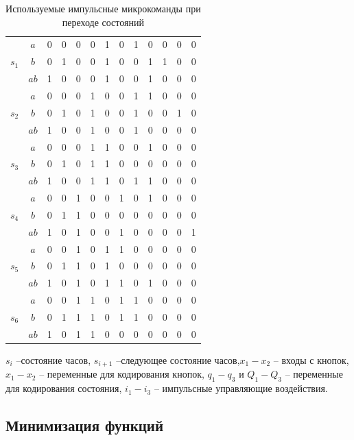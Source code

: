 \documentclass[10pt,a4paper,final]{article} %
\begin{document}
\begin{table}[h!]
\begin{tabular}{|c|c|cc|ccc|ccc|ccc|}
			\multirow{3}{*}{$s_1$} & $a$ & 0 &	0	 & 0	& 0	& 1	& 0	& 1	& 0	& 0	& 0	& 0 \\
			& $b$ & 0	& 1	& 0	& 0	& 1	& 0	& 0	& 1	& 1	& 0	& 0 \\ 
			& $ab$  & 1	& 0	& 0	& 0	& 1	& 0	& 0	& 1	& 0	& 0	& 0 \\
			\hline
			\multirow{3}{*}{$s_2$} & $a$  & 0	& 0	& 0	& 1	& 0	& 0	& 1	& 1	& 0	& 0	& 0 \\
			& $b$ & 0	& 1	& 0	& 1	& 0	& 0	& 1	& 0	& 0	& 1	& 0 \\
			& $ab$& 1	& 0	& 0	& 1	& 0	& 0	& 1	& 0	& 0	& 0	& 0 \\
			\hline
			\multirow{3}{*}{$s_3$} & $a$  & 0	& 0	& 0	& 1	& 1	& 0	& 0	& 1	& 0	& 0	& 0 \\
			& $b$ & 0	& 1	& 0	& 1	& 1	& 0	& 0	& 0	& 0	& 0	& 0 \\
			& $ab$ & 1	& 0	& 0	& 1	& 1	& 0	& 1	& 1	& 0	& 0	& 0 \\
			\hline
			\multirow{3}{*}{$s_4$} & $a$& 0	& 0	& 1	& 0	& 0	& 1	& 0	& 1	& 0	& 0	& 0 \\
			& $b$ & 0	& 1	& 1	& 0	& 0	& 0	& 0	& 0	& 0	& 0	& 0 \\
			& $ab$ & 1	& 0	& 1	& 0	& 0	& 1	& 0	& 0	& 0	& 0	& 1 \\
			\hline
			\multirow{3}{*}{$s_5$} & $a$ & 0	& 0	& 1	& 0	& 1	& 1	& 0	& 0	& 0	& 0	& 0 \\
			& $b$ & 0	& 1	& 1	& 0	& 1	& 0	& 0	& 0	& 0	& 0	& 0 \\
			& $ab$ & 1	& 0	& 1	& 0	& 1	& 1	& 0	& 1	& 0	& 0	& 0 \\
			\hline
			\multirow{3}{*}{$s_6$} & $a$& 0	& 0	& 1	& 1	& 0	& 1	& 1	& 0	& 0	& 0	& 0 \\
			& $b$ & 0	& 1	& 1	& 1	& 0	& 1	& 1	& 0	& 0	& 0	& 0 \\
			& $ab$& 1	& 0	& 1	& 1	& 0	& 0	& 0	& 0	& 0	& 0	& 0 \\
			
			\hline
		\end{tabular}
	\label{F}
	\caption{Используемые импульсные микрокоманды при переходе состояний}
\end{table}

$s_i$ --состояние часов, $s_{i+1}$ --следующее состояние часов,$x_1 - x_2$ -- входы с кнопок, $x_1 - x_2$ -- переменные для кодирования кнопок, $q_1 - q_3$ и $Q_1 - Q_3$  -- переменные для кодирования состояния, $i_1 - i_3$ -- импульсные управляющие воздействия.



\subsection{Минимизация функций}
\end{document}
